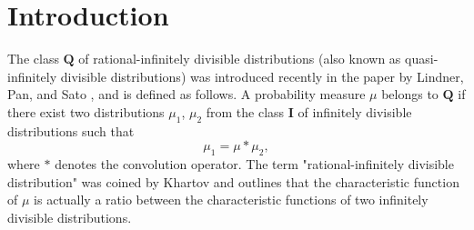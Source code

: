 \documentclass[numbers,webpdf,imaiai]{ima-authoring-template}%
\theoremstyle{thmstyletwo}%
\newcommand{\Q}{\pmb{Q}}
\newcommand{\ID}{\pmb{I}}
\numberwithin{equation}{section}
\begin{document}
\maketitle
\thispagestyle{empty}


\section{Introduction}

The class $\Q$ of rational-infinitely divisible distributions (also known as quasi-infinitely divisible distributions) was introduced recently in the paper by Lindner, Pan, and Sato \citep{LPS2018}, and is defined as follows. 
A probability measure $\mu$ belongs to $\Q$ if there exist two distributions $\mu_1$, $\mu_2$ from the class $\ID$ of infinitely divisible distributions such that 
\begin{equation*}
    \mu_1 = \mu * \mu_2,
\end{equation*}
where $*$ denotes the convolution operator.  The term "rational-infinitely divisible distribution" was coined by Khartov \citep{Khartov2026} and outlines that the characteristic function of $\mu$ is  actually a ratio between the characteristic functions of two infinitely divisible distributions.
\end{document}
